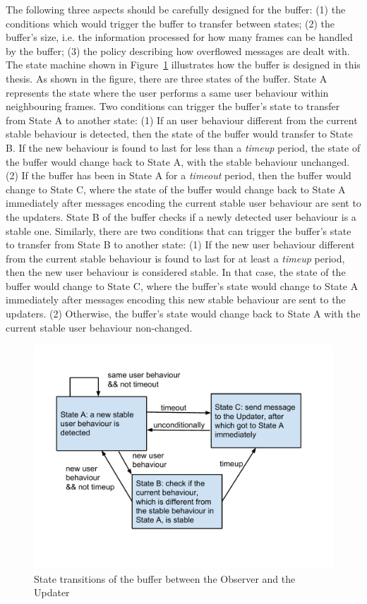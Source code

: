 The following three aspects should be carefully designed for the buffer: (1) the conditions which would trigger the buffer to transfer between states; (2) the buffer's size, i.e. the information processed for how many frames can be handled by the buffer; (3) the policy describing how overflowed messages are dealt with. The state machine shown in Figure~\ref{fig:state-trans} illustrates how the buffer is designed in this thesis. As shown in the figure, there are three states of the buffer. State A represents the state where the user performs a same user behaviour within neighbouring frames. Two conditions can trigger the buffer's state to transfer from State A to another state: (1) If an user behaviour different from the current stable behaviour is detected, then the state of the buffer would transfer to State B. If the new behaviour is found to last for less than a \textit{timeup} period, the state of the buffer would change back to State A, with the stable behaviour unchanged. (2) If the buffer has been in State A for a \textit{timeout} period, then the buffer would change to State C, where the state of the buffer would change back to State A immediately after messages encoding the current stable user behaviour are sent to the updaters. State B of the buffer checks if a newly detected user behaviour is a stable one. Similarly, there are two conditions that can trigger the buffer's state to transfer from State B to another state: (1) If the new user behaviour different from the current stable behaviour is found to last for at least a \textit{timeup} period, then the new user behaviour is considered stable. In that case, the state of the buffer would change to State C, where the buffer's state would change to State A immediately after messages encoding this new stable behaviour are sent to the updaters. (2) Otherwise, the buffer's state would change back to State A with the current stable user behaviour non-changed.

\begin{figure}[htp]
\centering
\includegraphics[trim = 10mm 25mm 16mm 15mm, clip, width=0.8\linewidth]{fig/fig-state-trans.pdf}
\caption{State transitions of the buffer between the Observer and the Updater}
\label{fig:state-trans}
\end{figure}
 

